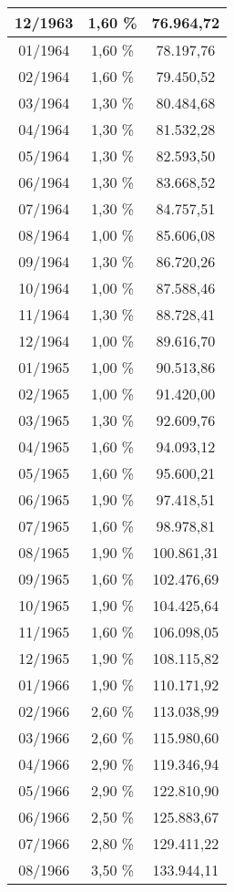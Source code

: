 \begin{center}
\begin{longtable}{|c|c|c|}
12/1963 & 1,60 \% & 76.964,72 \\ \hline
01/1964 & 1,60 \% & 78.197,76 \\ \hline
02/1964 & 1,60 \% & 79.450,52 \\ \hline
03/1964 & 1,30 \% & 80.484,68 \\ \hline
04/1964 & 1,30 \% & 81.532,28 \\ \hline
05/1964 & 1,30 \% & 82.593,50 \\ \hline
06/1964 & 1,30 \% & 83.668,52 \\ \hline
07/1964 & 1,30 \% & 84.757,51 \\ \hline
08/1964 & 1,00 \% & 85.606,08 \\ \hline
09/1964 & 1,30 \% & 86.720,26 \\ \hline
10/1964 & 1,00 \% & 87.588,46 \\ \hline
11/1964 & 1,30 \% & 88.728,41 \\ \hline
12/1964 & 1,00 \% & 89.616,70 \\ \hline
01/1965 & 1,00 \% & 90.513,86 \\ \hline
02/1965 & 1,00 \% & 91.420,00 \\ \hline
03/1965 & 1,30 \% & 92.609,76 \\ \hline
04/1965 & 1,60 \% & 94.093,12 \\ \hline
05/1965 & 1,60 \% & 95.600,21 \\ \hline
06/1965 & 1,90 \% & 97.418,51 \\ \hline
07/1965 & 1,60 \% & 98.978,81 \\ \hline
08/1965 & 1,90 \% & 100.861,31 \\ \hline
09/1965 & 1,60 \% & 102.476,69 \\ \hline
10/1965 & 1,90 \% & 104.425,64 \\ \hline
11/1965 & 1,60 \% & 106.098,05 \\ \hline
12/1965 & 1,90 \% & 108.115,82 \\ \hline
01/1966 & 1,90 \% & 110.171,92 \\ \hline
02/1966 & 2,60 \% & 113.038,99 \\ \hline
03/1966 & 2,60 \% & 115.980,60 \\ \hline
04/1966 & 2,90 \% & 119.346,94 \\ \hline
05/1966 & 2,90 \% & 122.810,90 \\ \hline
06/1966 & 2,50 \% & 125.883,67 \\ \hline
07/1966 & 2,80 \% & 129.411,22 \\ \hline
08/1966 & 3,50 \% & 133.944,11 \\ \hline

\end{longtable}
\end{center}
